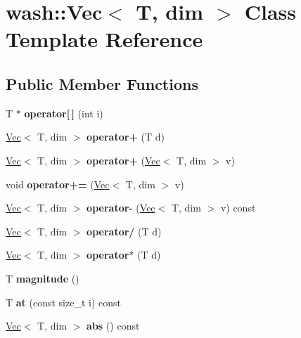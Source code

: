 \hypertarget{classwash_1_1Vec}{}\section{wash\+:\+:Vec$<$ T, dim $>$ Class Template Reference}
\label{classwash_1_1Vec}
\subsection*{Public Member Functions}
\begin{DoxyCompactItemize}
\item 
\mbox{\label{classwash_1_1Vec_a5927d6caa8489a88b8470fe8bb8779d0}} 
T $\ast$ {\bfseries operator\mbox{[}$\,$\mbox{]}} (int i)
\item 
\mbox{\label{classwash_1_1Vec_ad8a8863138b26c2b2eae41e11f40e78f}} 
\mbox{\hyperlink{classwash_1_1Vec}{Vec}}$<$ T, dim $>$ {\bfseries operator+} (T d)
\item 
\mbox{\label{classwash_1_1Vec_a951a842c43b3cf99d60abfe73e53475c}} 
\mbox{\hyperlink{classwash_1_1Vec}{Vec}}$<$ T, dim $>$ {\bfseries operator+} (\mbox{\hyperlink{classwash_1_1Vec}{Vec}}$<$ T, dim $>$ v)
\item 
\mbox{\label{classwash_1_1Vec_ac92d90da0a36cdd6b38a8a12e341fa84}} 
void {\bfseries operator+=} (\mbox{\hyperlink{classwash_1_1Vec}{Vec}}$<$ T, dim $>$ v)
\item 
\mbox{\label{classwash_1_1Vec_a83a86542f9afb7ea0b5b7b8ab72eb119}} 
\mbox{\hyperlink{classwash_1_1Vec}{Vec}}$<$ T, dim $>$ {\bfseries operator-\/} (\mbox{\hyperlink{classwash_1_1Vec}{Vec}}$<$ T, dim $>$ v) const
\item 
\mbox{\label{classwash_1_1Vec_a972cde51776de1a9efec7ed6ea02f401}} 
\mbox{\hyperlink{classwash_1_1Vec}{Vec}}$<$ T, dim $>$ {\bfseries operator/} (T d)
\item 
\mbox{\label{classwash_1_1Vec_a6fc9e30b352c72c7307bd28ee6c0aa72}} 
\mbox{\hyperlink{classwash_1_1Vec}{Vec}}$<$ T, dim $>$ {\bfseries operator$\ast$} (T d)
\item 
\mbox{\label{classwash_1_1Vec_a41de499daf12160b2cf515ce0c9da70f}} 
T {\bfseries magnitude} ()
\item 
\mbox{\label{classwash_1_1Vec_a1be26013b6d4f898b8504fc258043400}} 
T {\bfseries at} (const size\+\_\+t i) const
\item 
\mbox{\label{classwash_1_1Vec_aae15a1a2cea7e883e53c2e7f6164710a}} 
\mbox{\hyperlink{classwash_1_1Vec}{Vec}}$<$ T, dim $>$ {\bfseries abs} () const
\end{DoxyCompactItemize}
